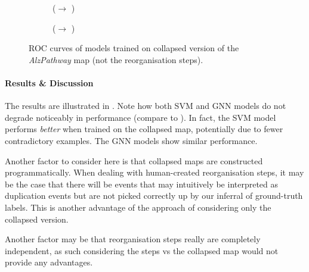 \documentclass[
	fontsize=10pt, %
	twoside=false, %
	secnumdepth=1, %
  toc=indentunnumbered %
]{kaobook}
\begin{document}
\begin{figure}[h]
  \centering
  \begin{subfigure}[h]{0.48\linewidth}
    \caption{(\ADLast $\rightarrow$ \PDMap)}
  \end{subfigure}
  \begin{subfigure}[h]{0.48\linewidth}
    \caption{(\ADLast $\rightarrow$ \ReconMap)}
  \end{subfigure}
  \caption{ROC curves of models trained on collapsed version of the
    \textit{AlzPathway} map (not the reorganisation steps).}
  \label{fig:importance-reorganisation-steps}
\end{figure}

\paragraph{Results \& Discussion} The results are illustrated in
. Note how both SVM and GNN models do
not degrade noticeably in performance (compare to ). In
fact, the SVM model performs \textit{better} when trained on the collapsed map,
potentially due to fewer contradictory examples. The GNN models show similar
performance.


Another factor to consider here is that collapsed maps are constructed
programmatically. When dealing with human-created reorganisation steps, it may
be the case that there will be events that may intuitively be interpreted as
duplication events but are not picked correctly up by our inferral of
ground-truth labels. This is another advantage of the approach of considering
only the collapsed version.

Another factor may be that reorganisation steps really are completely
independent, as such considering the steps vs the collapsed map would not
provide any advantages.

\end{document}

